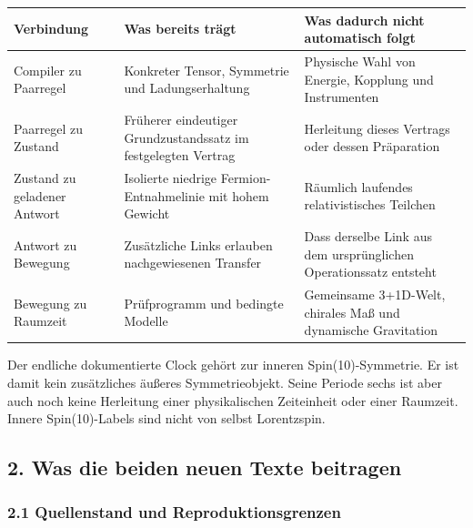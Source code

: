 {\def\LTcaptype{none} %
\begin{longtable}[]{@{}
  >{\raggedright\arraybackslash}p{}
  >{\raggedright\arraybackslash}p{}
  >{\raggedright\arraybackslash}p{}@{}}
\toprule\noalign{}
\begin{minipage}[b]{\linewidth}\raggedright
Verbindung
\end{minipage} & \begin{minipage}[b]{\linewidth}\raggedright
Was bereits trägt
\end{minipage} & \begin{minipage}[b]{\linewidth}\raggedright
Was dadurch nicht automatisch folgt
\end{minipage} \\
\midrule\noalign{}
\endhead
\bottomrule\noalign{}
\endlastfoot
Compiler zu Paarregel & Konkreter Tensor, Symmetrie und Ladungserhaltung
& Physische Wahl von Energie, Kopplung und Instrumenten \\
Paarregel zu Zustand & Früherer eindeutiger Grundzustandssatz im
festgelegten Vertrag & Herleitung dieses Vertrags oder dessen
Präparation \\
Zustand zu geladener Antwort & Isolierte niedrige Fermion-Entnahmelinie
mit hohem Gewicht & Räumlich laufendes relativistisches Teilchen \\
Antwort zu Bewegung & Zusätzliche Links erlauben nachgewiesenen Transfer
& Dass derselbe Link aus dem ursprünglichen Operationssatz entsteht \\
Bewegung zu Raumzeit & Prüfprogramm und bedingte Modelle & Gemeinsame
3+1D-Welt, chirales Maß und dynamische Gravitation \\
\end{longtable}
}

Der endliche dokumentierte Clock gehört zur inneren Spin(10)-Symmetrie.
Er ist damit kein zusätzliches äußeres Symmetrieobjekt. Seine Periode
sechs ist aber auch noch keine Herleitung einer physikalischen
Zeiteinheit oder einer Raumzeit. Innere Spin(10)-Labels sind nicht von
selbst Lorentzspin.

\subsection{2. Was die beiden neuen Texte
beitragen}\label{was-die-beiden-neuen-texte-beitragen}

\subsubsection{2.1 Quellenstand und
Reproduktionsgrenzen}\label{quellenstand-und-reproduktionsgrenzen}

